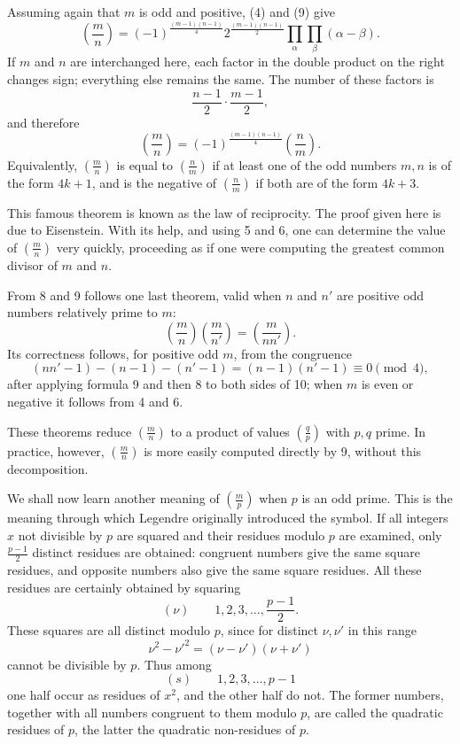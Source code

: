 \documentclass[11pt]{article}
\begin{document}
Assuming again that $m$ is odd and positive, (4) and (9) give
\[
\tag{10}
\left(\frac mn\right)
=(-1)^{\frac{(m-1)(n-1)}4}
2^{\frac{(m-1)(n-1)}2}\prod_\alpha\prod_\beta(\alpha-\beta).
\]
If $m$ and $n$ are interchanged here, each factor in the double product on the right changes sign; everything else remains the same. The number of these factors is
\[
        \frac{n-1}{2}\cdot\frac{m-1}{2},
\]
and therefore
\[
\tag{9'}
        \left(\frac mn\right)
        =(-1)^{\frac{(m-1)(n-1)}4}\left(\frac nm\right).
\]
Equivalently, $\left(\frac mn\right)$ is equal to $\left(\frac nm\right)$ if at least one of the odd numbers $m,n$ is of the form $4k+1$, and is the negative of $\left(\frac nm\right)$ if both are of the form $4k+3$.

This famous theorem is known as the law of reciprocity. The proof given here is due to Eisenstein. With its help, and using 5 and 6, one can determine the value of $\left(\frac mn\right)$ very quickly, proceeding as if one were computing the greatest common divisor of $m$ and $n$.

From 8 and 9 follows one last theorem, valid when $n$ and $n'$ are positive odd numbers relatively prime to $m$:
\[
\tag{10'}
        \left(\frac mn\right)\left(\frac m{n'}\right)
        =
        \left(\frac m{nn'}\right).
\]
Its correctness follows, for positive odd $m$, from the congruence
\[
\tag{7'}
 (nn'-1)-(n-1)-(n'-1)
 = (n-1)(n'-1)\equiv0\pmod 4,
\]
after applying formula 9 and then 8 to both sides of 10; when $m$ is even or negative it follows from 4 and 6.

These theorems reduce $\left(\frac mn\right)$ to a product of values $\left(\frac qp\right)$ with $p,q$ prime. In practice, however, $\left(\frac mn\right)$ is more easily computed directly by 9, without this decomposition.

We shall now learn another meaning of $\left(\frac mp\right)$ when $p$ is an odd prime. This is the meaning through which Legendre originally introduced the symbol. If all integers $x$ not divisible by $p$ are squared and their residues modulo $p$ are examined, only $\frac{p-1}{2}$ distinct residues are obtained: congruent numbers give the same square residues, and opposite numbers also give the same square residues. All these residues are certainly obtained by squaring
\[
(\nu)\qquad 1,2,3,\ldots,\frac{p-1}{2}.
\]
These squares are all distinct modulo $p$, since for distinct $\nu,\nu'$ in this range
\[
        \nu^2-\nu'^2=(\nu-\nu')(\nu+\nu')
\]
cannot be divisible by $p$. Thus among
\[
(s)\qquad 1,2,3,\ldots,p-1
\]
one half occur as residues of $x^2$, and the other half do not. The former numbers, together with all numbers congruent to them modulo $p$, are called the quadratic residues of $p$, the latter the quadratic non-residues of $p$.
\end{document}
